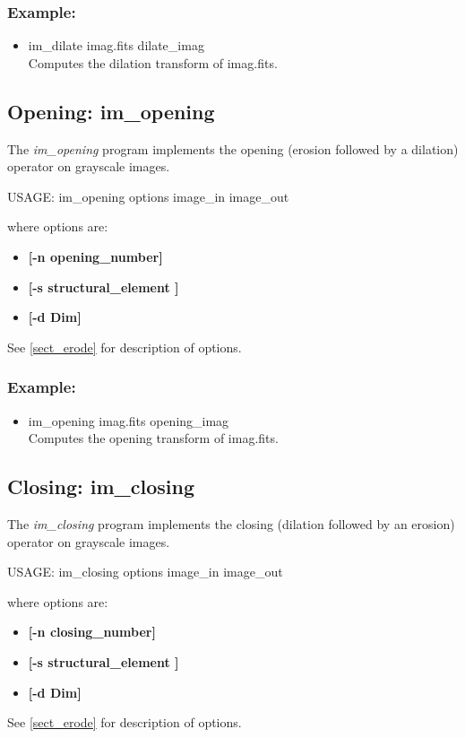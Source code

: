 \subsubsection*{Example:}
\begin{itemize}
\item  im\_dilate imag.fits dilate\_imag \\
Computes the dilation transform of imag.fits.
\end{itemize}

\subsection{Opening: im\_opening}
The {\em im\_opening} program implements the 
opening (erosion followed by a dilation)
 operator on grayscale images.
{\bf
\begin{center}
USAGE: im\_opening options image\_in image\_out
\end{center}}
where options are:
\begin{itemize}
\item {\bf[-n opening\_number]}  
\item{\bf [-s structural\_element ]} 
\item{\bf [-d Dim]}   
\end{itemize}
See \ref{sect_erode} for description of options.
\subsubsection*{Example:}
\begin{itemize}
\item  im\_opening imag.fits opening\_imag \\
Computes the opening transform of imag.fits.
\end{itemize}

\subsection{Closing: im\_closing}
The {\em im\_closing} program implements the 
closing (dilation followed by an erosion)
 operator on grayscale images.
{\bf
\begin{center}
USAGE: im\_closing options image\_in image\_out
\end{center}}
where options are:
\begin{itemize}
\item {\bf[-n closing\_number]}  
\item{\bf [-s structural\_element ]} 
\item{\bf [-d Dim]}   
\end{itemize}
See \ref{sect_erode} for description of options.
